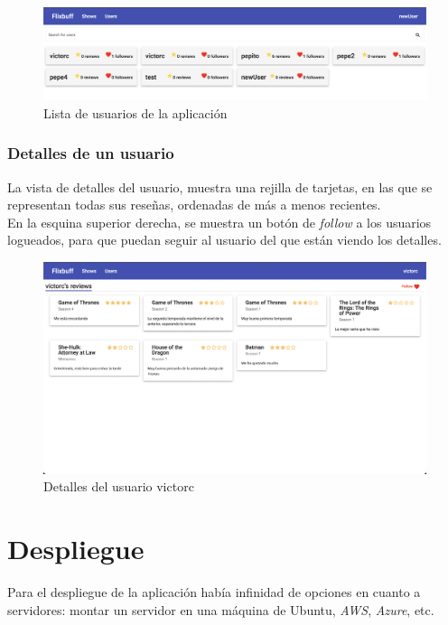 \begin{figure}[H]
    \centering	
        \includegraphics[scale=0.25]{img/user-list.png}
    \caption{ Lista de usuarios de la aplicación }\label{fig:user-list}
\end{figure}

\subsubsection{Detalles de un usuario}
La vista de detalles del usuario, muestra una rejilla de tarjetas, en las que se representan todas sus reseñas,
ordenadas de más a menos recientes.\\

En la esquina superior derecha, se muestra un botón de \textit{follow} a los usuarios logueados, para que puedan seguir
al usuario del que están viendo los detalles.\\

\begin{figure}[H]
    \centering	
        \includegraphics[scale=0.25]{img/user-details.png}
    \caption{ Detalles del usuario victorc }\label{fig:user-details}
\end{figure}

\section{Despliegue}\label{sec:despliegue}
Para el despliegue de la aplicación había infinidad de opciones en cuanto a servidores: montar un servidor en una
máquina de Ubuntu, \textit{AWS}\cite{aws}, \textit{Azure}\cite{azure}, etc.\\

